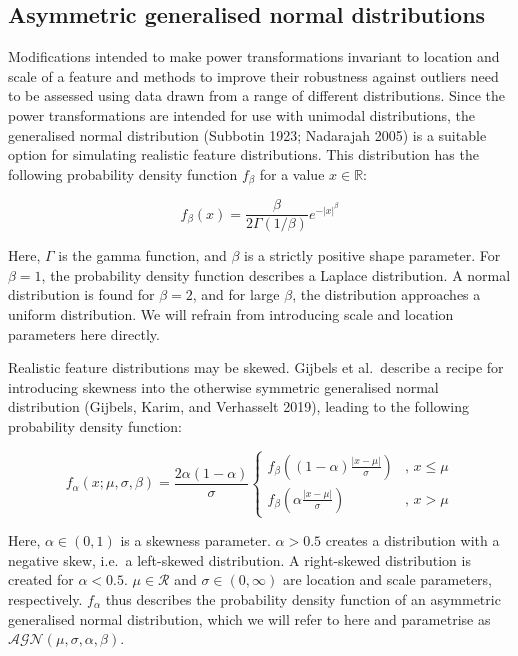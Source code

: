 \documentclass[
  a4paper,
]{article}
\begin{document}
\subsection{Asymmetric generalised normal
distributions}\label{asymmetric-generalised-normal-distributions}

Modifications intended to make power transformations invariant to
location and scale of a feature and methods to improve their robustness
against outliers need to be assessed using data drawn from a range of
different distributions. Since the power transformations are intended
for use with unimodal distributions, the generalised normal distribution
(Subbotin 1923; Nadarajah 2005) is a suitable option for simulating
realistic feature distributions. This distribution has the following
probability density function \(f_{\beta}\) for a value
\(x \in \mathbb{R}\):

\begin{equation}
f_{\beta}(x) = \frac{\beta}{2\Gamma\left(1 / \beta \right)} e^{-\left| x \right|^\beta}
\end{equation}

Here, \(\Gamma\) is the gamma function, and \(\beta\) is a strictly
positive shape parameter. For \(\beta = 1\), the probability density
function describes a Laplace distribution. A normal distribution is
found for \(\beta=2\), and for large \(\beta\), the distribution
approaches a uniform distribution. We will refrain from introducing
scale and location parameters here directly.

Realistic feature distributions may be skewed. Gijbels et al.~describe a
recipe for introducing skewness into the otherwise symmetric generalised
normal distribution (Gijbels, Karim, and Verhasselt 2019), leading to
the following probability density function:

\begin{equation}
f_{\alpha}(x; \mu, \sigma, \beta) = \frac{2 \alpha \left(1 - \alpha\right)}{\sigma}
\begin{cases}
f_{\beta}\left( \left(1 - \alpha \right) \frac{\left| x - \mu \right|}{\sigma} \right) & \text{, } x \leq \mu \\
f_{\beta}\left( \alpha \frac{\left| x - \mu \right|}{\sigma} \right) & \text{, } x > \mu
\end{cases}
\end{equation}

Here, \(\alpha \in (0,1)\) is a skewness parameter. \(\alpha > 0.5\)
creates a distribution with a negative skew, i.e.~a left-skewed
distribution. A right-skewed distribution is created for
\(\alpha < 0.5\). \(\mu \in \mathcal{R}\) and \(\sigma \in (0, \infty)\)
are location and scale parameters, respectively. \(f_{\alpha}\) thus
describes the probability density function of an asymmetric generalised
normal distribution, which we will refer to here and parametrise as
\(\mathcal{AGN}\left(\mu, \sigma, \alpha, \beta \right)\).
\end{document}
